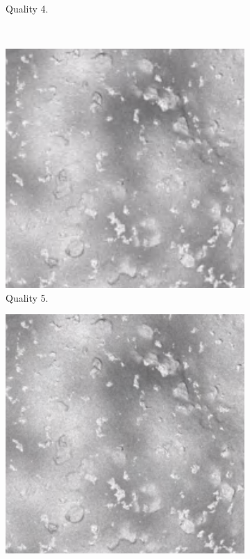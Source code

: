 \begin{figure}[htb]
\begin{subfigure}[b]{0.47\textwidth}
            \caption{Quality 4.}
            \label{fig:img_quality_4}
        \end{subfigure}
        \\
        \begin{subfigure}[b]{0.47\textwidth}
            \centering
                \includegraphics[width=\textwidth]{doc/thesis/0_figures/quality_compare/jp2_5_center.png}
            \caption{Quality 5.}
            \label{fig:img_quality_5}
        \end{subfigure}
        \begin{subfigure}[b]{0.47\textwidth}
            \centering
                \includegraphics[width=\textwidth]{doc/thesis/0_figures/quality_compare/jp2_10_center.png}

\end{subfigure}
\end{figure}
